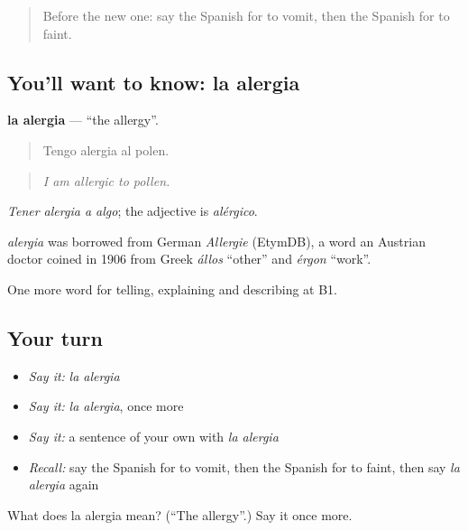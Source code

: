 \label{lesson:ES-C740-alergia}



\begin{quote}
Before the new one: say the Spanish for to vomit, then the Spanish for to faint.
\end{quote}

\subsection*{You'll want to know: la alergia}
\textbf{la alergia} — \textquotedblleft{}the allergy\textquotedblright{}.

\begin{quote}
Tengo alergia al polen.
\end{quote}

\begin{quote}
\emph{I am allergic to pollen.}
\end{quote}

\emph{Tener alergia a algo}; the adjective is \emph{alérgico}.

\begin{cousinweb}
\emph{alergia} was borrowed from German \emph{Allergie} (EtymDB), a word an Austrian doctor coined in 1906 from Greek \emph{állos} \textquotedblleft{}other\textquotedblright{} and \emph{érgon} \textquotedblleft{}work\textquotedblright{}.
\end{cousinweb}

\begin{grammarlens}[title={What you've built}]
One more word for telling, explaining and describing at B1.
\end{grammarlens}

\subsection*{Your turn}
\begin{itemize}
\raggedright
  \item \emph{Say it:} \emph{la alergia}
  \item \emph{Say it:} \emph{la alergia}, once more
  \item \emph{Say it:} a sentence of your own with \emph{la alergia}
  \item \emph{Recall:} say the Spanish for to vomit, then the Spanish for to faint, then say \emph{la alergia} again
\end{itemize}

\begin{tcolorbox}[breakable,colback=teal!4,colframe=teal!35!black,title={Before you move on}]
What does la alergia mean? (\textquotedblleft{}The allergy\textquotedblright{}.) Say it once more.
\end{tcolorbox}
